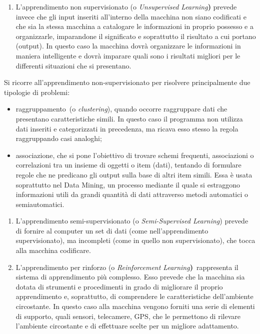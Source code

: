 \documentclass[
  b5paper,
  twoside,
  12pt,
  chapterprefix=false,
  bibliography=totocnumbered,
  parskip=false]{scrbook}
\providecommand{\tightlist}{%
  \setlength{\itemsep}{0pt}\setlength{\parskip}{0pt}}
\begin{document}
\begin{enumerate}
\def\labelenumi{\arabic{enumi}.}
\setcounter{enumi}{1}
\tightlist
\item
  L'apprendimento non supervisionato (o \emph{Unsupervised Learning}\textbf{)}
  prevede invece che gli input inseriti all'interno della macchina non
  siano codificati e che sia la stessa macchina a catalogare le
  informazioni in proprio possesso e a organizzarle, imparandone il
  significato e soprattutto il risultato a cui portano (output). In
  questo caso la macchina dovrà organizzare le informazioni in maniera
  intelligente e dovrà imparare quali sono i risultati migliori per le
  differenti situazioni che si presentano.
\end{enumerate}

Si ricorre all'apprendimento non-supervisionato per risolvere
principalmente due tipologie di problemi:

\begin{itemize}
\item
  raggruppamento~(o \emph{clustering}), quando occorre raggruppare dati che
  presentano caratteristiche simili. In questo caso il programma non
  utilizza dati inseriti e categorizzati in precedenza, ma ricava esso
  stesso la regola raggruppando casi analoghi;
\item
  associazione, che si pone l'obiettivo di trovare schemi frequenti,
  associazioni o correlazioni tra un insieme di oggetti o item (dati),
  tentando di formulare regole che ne predicano gli output sulla base
  di altri item simili. Essa è usata soprattutto nel Data Mining, un
  processo mediante il quale si estraggono informazioni utili da
  grandi quantità di dati attraverso metodi automatici o
  semiautomatici.
\end{itemize}

\begin{enumerate}
\def\labelenumi{\arabic{enumi}.}
\setcounter{enumi}{2}
\item
  L'apprendimento semi-supervisionato (o \emph{Semi-Supervised Learning})
  prevede di fornire al computer un set di dati (come
  nell'apprendimento supervisionato), ma incompleti (come in quello
  non supervisionato), che tocca alla macchina codificare.
\item
  L'apprendimento per rinforzo (o \emph{Reinforcement
  Learning}\textbf{)}~rappresenta il sistema di apprendimento più
  complesso. Esso prevede che la macchina sia dotata di strumenti e
  procedimenti in grado di migliorare il proprio apprendimento e,
  soprattutto, di comprendere le caratteristiche dell'ambiente
  circostante. In questo caso alla macchina vengono forniti una serie
  di elementi di supporto, quali sensori, telecamere, GPS, che le
  permettono di rilevare l'ambiente circostante e di effettuare scelte
  per un migliore adattamento.
\end{enumerate}
\end{document}

